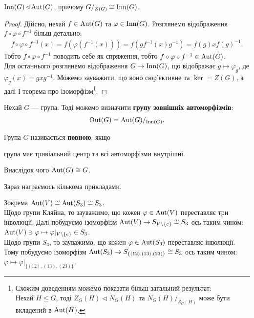 \documentclass{math_library}
\begin{document}
\begin{theorem}
$\operatorname{Inn}(G) \triangleleft \operatorname{Aut}(G)$, причому $G/_{Z(G)} \cong \operatorname{Inn}(G)$.
\end{theorem}

\begin{proof}
Дійсно, нехай $f \in \operatorname{Aut}(G)$ та $\varphi \in \operatorname{Inn}(G)$. Розглянемо відображення $f \circ \varphi \circ f^{-1}$ більш детально:
\begin{align*}
f \circ \varphi \circ f^{-1}(x) = f(\varphi(f^{-1}(x))) = f(g f^{-1}(x) g^{-1}) = f(g) x f(g)^{-1}.
\end{align*}
Тобто $f \circ \varphi \circ f^{-1}$ поводить себе як спряження, тобто $f \circ \varphi \circ f^{-1} \in \operatorname{Aut}(G)$.
\bigskip \\
Для останнього розглянемо відображення $G \to \operatorname{Inn}(G)$, що відображає $g \mapsto \varphi_g$, де $\varphi_g(x) = gxg^{-1}$. Можемо зауважити, що воно сюр'єктивне та $\ker = Z(G)$, а далі І теорема про ізоморфізм\footnote{Схожим доведенням можемо показати більш загальний результат:\\
Нехай $H \leq G$, тоді $Z_G(H) \triangleleft N_G(H)$ та $N_G(H)/_{Z_G(H)}$ може бути вкладений в $\operatorname{Aut}(H)$.}.
\end{proof}

\begin{definition}
Нехай $G$ --- група. Тоді можемо визначити \textbf{групу зовнішніх автоморфізмів}:
\begin{align*}
\operatorname{Out}(G) = \operatorname{Aut}(G)/_{\operatorname{Inn}(G)}.
\end{align*}
\end{definition}

\begin{definition}
Група $G$ називається \textbf{повною}, якщо
\begin{center}
група має тривіальний центр та всі автоморфізми внутрішні.
\end{center}
Внаслідок чого $\operatorname{Aut}(G) \cong G$.
\end{definition}

Зараз награємось кількома прикладами.

\begin{example}
Зокрема $\operatorname{Aut}(V) \cong \operatorname{Aut}(S_3) \cong S_3$.
\bigskip \\
Щодо групи Кляйна, то зауважимо, що кожен $\varphi \in \operatorname{Aut}(V)$ переставляє три інволюції. Далі побудуємо ізоморфізм $\operatorname{Aut}(V) \to S_{V \setminus \{e\}} \cong S_3$ ось таким чином: $\operatorname{Aut}(V) \ni \varphi \mapsto \varphi|_{V \setminus \{e\}} \in S_3$.
\bigskip \\
Щодо групи $S_3$, то зауважимо, що кожен $\varphi \in \operatorname{Aut}(S_3)$ переставляє інволюції. Тому побудуємо ізоморфізм $\operatorname{Aut}(S_3) \to S_{\{(12),(13),(23)\}} \cong S_3$ ось таким чином: $\varphi \mapsto \varphi|_{\{(12),(13),(23)\}}$.
\end{example}
\end{document}
